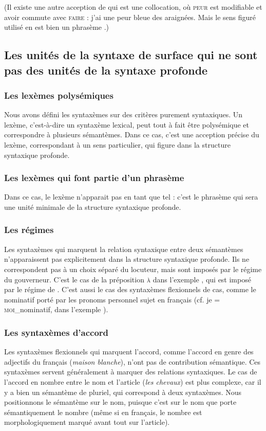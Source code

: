 (Il existe une autre acception de  qui est une collocation, où \textsc{peur} est modifiable et avoir commute avec \textsc{faire} : j’ai une peur bleue des araignées. Mais le sens figuré utilisé en  est bien un phrasème .)

\subsection{Les unités de la syntaxe de surface qui ne sont pas des unités de la syntaxe profonde}

\subsubsection{Les lexèmes polysémiques}
Nous avons défini les syntaxèmes sur des critères purement syntaxiques. Un lexème, c’est-à-dire un syntaxème lexical, peut tout à fait être polysémique et correspondre à plusieurs sémantèmes. Dans ce cas, c’est une acception précise du lexème, correspondant à un sens particulier, qui figure dans la structure syntaxique profonde.

\subsubsection{Les lexèmes qui font partie d’un phrasème} 
Dans ce cas, le lexème n’apparait pas en tant que tel : c’est le phrasème qui sera une unité minimale de la structure syntaxique profonde.

\subsubsection{Les régimes}
Les syntaxèmes qui marquent la relation syntaxique entre deux sémantèmes n’apparaissent pas explicitement dans la structure syntaxique profonde. Ils ne correspondent pas à un choix séparé du locuteur, mais sont imposés par le régime du gouverneur. C’est le cas de la préposition \textsc{à} dans l’exemple , qui est imposé par le régime de . C’est aussi le cas des syntaxèmes flexionnels de cas, comme le nominatif porté par les pronoms personnel sujet en français (cf. je = \textsc{moi}\_nominatif, dans l’exemple ).

\subsubsection{Les syntaxèmes d’accord} 
Les syntaxèmes flexionnels qui marquent l’accord, comme l’accord en genre des adjectifs du français (\textit{maison blanche}), n’ont pas de contribution sémantique. Ces syntaxèmes servent généralement à marquer des relations syntaxiques. Le cas de l’accord en nombre entre le nom et l’article (\textit{les chevaux}) est plus complexe, car il y a bien un sémantème de pluriel, qui correspond à deux syntaxèmes. Nous positionnons le sémantème sur le nom, puisque c’est sur le nom que porte sémantiquement le nombre (même si en français, le nombre est morphologiquement marqué avant tout sur l’article).

